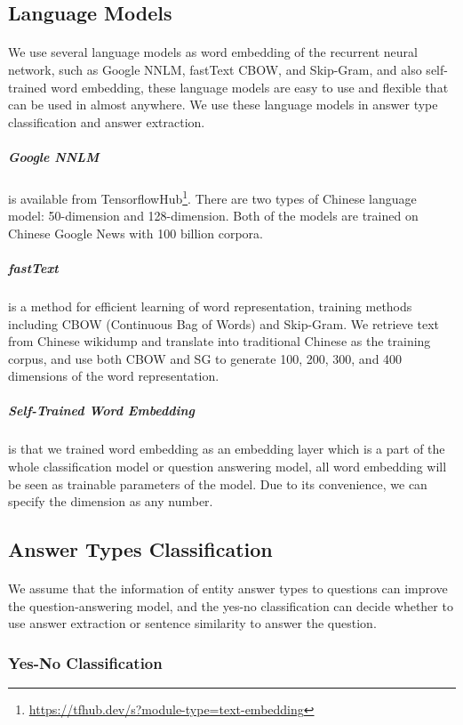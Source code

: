\documentclass{article}
\begin{document}
\subsection{Language Models}
\paragraph{}
We use several language models as word embedding of the recurrent neural network, such as Google NNLM, fastText\cite{bojanowski2017enriching} CBOW, and Skip-Gram, and also self-trained word embedding, these language models are easy to use and flexible that can be used in almost anywhere. We use these language models in answer type classification and answer extraction.

\subparagraph{Google NNLM} is available from TensorflowHub\footnote{\url{https://tfhub.dev/s?module-type=text-embedding}}. There are two types of Chinese language model: 50-dimension and 128-dimension. Both of the models are trained on Chinese Google News with 100 billion corpora.

\subparagraph{fastText} is a method for efficient learning of word representation, training methods including CBOW (Continuous Bag of Words) and Skip-Gram. We retrieve text from Chinese wikidump and translate into traditional Chinese as the training corpus, and use both CBOW and SG to generate 100, 200, 300, and 400 dimensions of the word representation.

\subparagraph{Self-Trained Word Embedding} is that we trained word embedding as an embedding layer which is a part of the whole classification model or question answering model, all word embedding will be seen as trainable parameters of the model. Due to its convenience, we can specify the dimension as any number.

\subsection{Answer Types Classification}
\paragraph{}
We assume that the information of entity answer types to questions can improve the question-answering model, and the yes-no classification can decide whether to use answer extraction or sentence similarity to answer the question.

\subsubsection{Yes-No Classification}
\end{document}
